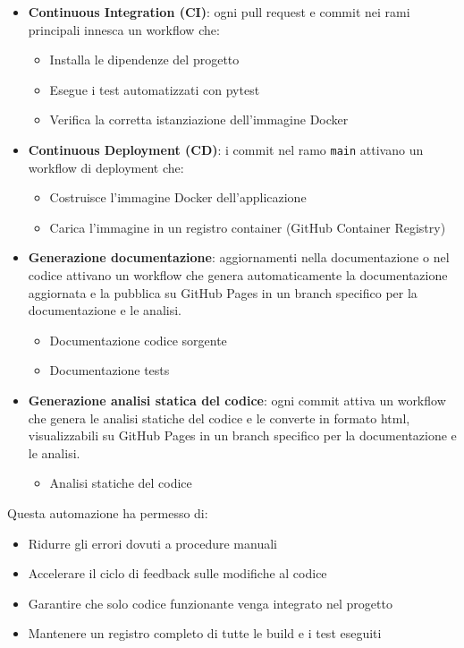 \documentclass[12pt,a4paper,oneside]{report}
\begin{document}
\begin{itemize}
    \item \textbf{Continuous Integration (CI)}: ogni pull request e commit nei rami principali innesca un workflow che:
          \begin{itemize}
              \item Installa le dipendenze del progetto
              \item Esegue i test automatizzati con pytest
              \item Verifica la corretta istanziazione dell'immagine Docker
          \end{itemize}

    \item \textbf{Continuous Deployment (CD)}: i commit nel ramo \texttt{main} attivano un workflow di deployment che:
          \begin{itemize}
              \item Costruisce l'immagine Docker dell'applicazione
              \item Carica l'immagine in un registro container (GitHub Container Registry)
          \end{itemize}

    \item \textbf{Generazione documentazione}: aggiornamenti nella documentazione o nel codice attivano un workflow che genera automaticamente la documentazione aggiornata e la pubblica su GitHub Pages in un branch specifico per la documentazione e le analisi.
          \begin{itemize}
              \item Documentazione codice sorgente \cite{code-docs}
              \item Documentazione tests \cite{tests-docs}
          \end{itemize}
    \item \textbf{Generazione analisi statica del codice}: ogni commit attiva un workflow che genera le analisi statiche del codice e le converte in formato html, visualizzabili su GitHub Pages in un branch specifico per la documentazione e le analisi.
          \begin{itemize}
              \item Analisi statiche del codice \cite{analysis-docs}
          \end{itemize}
\end{itemize}

Questa automazione ha permesso di:
\begin{itemize}
    \item Ridurre gli errori dovuti a procedure manuali
    \item Accelerare il ciclo di feedback sulle modifiche al codice
    \item Garantire che solo codice funzionante venga integrato nel progetto
    \item Mantenere un registro completo di tutte le build e i test eseguiti
\end{itemize}
\end{document}

